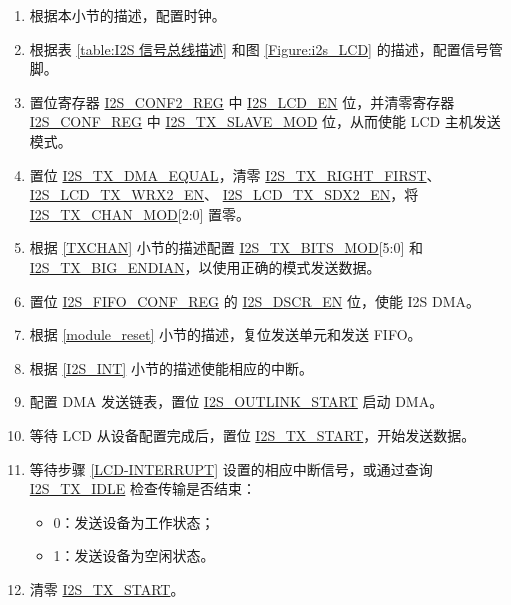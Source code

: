 \documentclass[main\_\_CN.tex]{subfiles}
\begin{document}
\begin{enumerate}
    \item 根据本小节的描述，配置时钟。

    \item 根据表 \ref{table:I2S 信号总线描述} 和图 \ref{Figure:i2s_LCD} 的描述，配置信号管脚。

    \item 置位寄存器 \hyperref[regdesc:I2SCONF2REG]{I2S\_CONF2\_REG} 中 \hyperref[fielddesc:I2SLCDEN]{I2S\_LCD\_EN} 位，并清零寄存器 \hyperref[regdesc:I2SCONFREG]{I2S\_CONF\_REG} 中 \hyperref[fielddesc:I2STXSLAVEMOD]{I2S\_TX\_SLAVE\_MOD} 位，从而使能 LCD 主机发送模式。

    \item 置位 \hyperref[fielddesc:I2STXDMAEQUAL]{I2S\_TX\_DMA\_EQUAL}，清零 \hyperref[fielddesc:I2STXRIGHTFIRST]{I2S\_TX\_RIGHT\_FIRST}、\hyperref[fielddesc:I2SLCDTXWRX2EN]{I2S\_LCD\_TX\_WRX2\_EN}、 \hyperref[fielddesc:I2SLCDTXSDX2EN]{I2S\_LCD\_TX\_SDX2\_EN}，将 \hyperref[fielddesc:I2STXCHANMOD]{I2S\_TX\_CHAN\_MOD}[2:0] 置零。
    \item 根据 \ref{TXCHAN} 小节的描述配置 \hyperref[fielddesc:I2STXBITSMOD]{I2S\_TX\_BITS\_MOD}[5:0] 和 \hyperref[fielddesc:I2STXBIGENDIAN]{I2S\_TX\_BIG\_ENDIAN}，以使用正确的模式发送数据。

    \item 置位 \hyperref[regdesc:I2SFIFOCONFREG]{I2S\_FIFO\_CONF\_REG} 的 \hyperref[fielddesc:I2SDSCREN]{I2S\_DSCR\_EN} 位，使能 I2S DMA。
    \item 根据 \ref{module_reset} 小节的描述，复位发送单元和发送 FIFO。
    \item 根据 \ref{I2S_INT} 小节的描述使能相应的中断。\label{LCD-INTERRUPT}

    \item 配置 DMA 发送链表，置位 \hyperref[fielddesc:I2SOUTLINKSTART]{I2S\_OUTLINK\_START} 启动 DMA。

    \item 等待 LCD 从设备配置完成后，置位 \hyperref[fielddesc:I2STXSTART]{I2S\_TX\_START}，开始发送数据。

    \item 等待步骤 \ref{LCD-INTERRUPT} 设置的相应中断信号，或通过查询 \hyperref[fielddesc:I2STXIDLE]{I2S\_TX\_IDLE} 检查传输是否结束：
    \begin{itemize}
        \item 0：发送设备为工作状态；
        \item 1：发送设备为空闲状态。
    \end{itemize}
    \item 清零 \hyperref[fielddesc:I2STXSTART]{I2S\_TX\_START}。

\end{enumerate}
\end{document}
